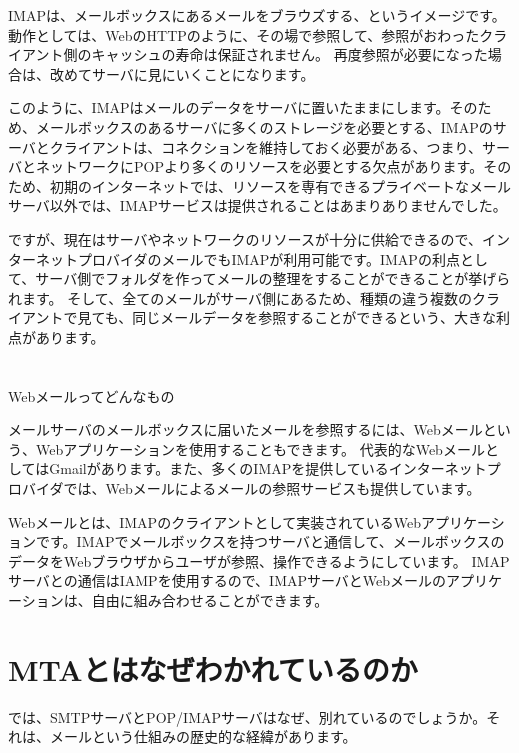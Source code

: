 IMAPは、メールボックスにあるメールをブラウズする、というイメージです。動作としては、WebのHTTPのように、その場で参照して、参照がおわったクライアント側のキャッシュの寿命は保証されません。
再度参照が必要になった場合は、改めてサーバに見にいくことになります。

このように、IMAPはメールのデータをサーバに置いたままにします。そのため、メールボックスのあるサーバに多くのストレージを必要とする、IMAPのサーバとクライアントは、コネクションを維持しておく必要がある、つまり、サーバとネットワークにPOPより多くのリソースを必要とする欠点があります。そのため、初期のインターネットでは、リソースを専有できるプライベートなメールサーバ以外では、IMAPサービスは提供されることはあまりありませんでした。

ですが、現在はサーバやネットワークのリソースが十分に供給できるので、インターネットプロバイダのメールでもIMAPが利用可能です。IMAPの利点として、サーバ側でフォルダを作ってメールの整理をすることができることが挙げられます。
そして、全てのメールがサーバ側にあるため、種類の違う複数のクライアントで見ても、同じメールデータを参照することができるという、大きな利点があります。

\section*{}
\begin{itembox}[l]{Webメールってどんなもの}

メールサーバのメールボックスに届いたメールを参照するには、Webメールという、Webアプリケーションを使用することもできます。
代表的なWebメールとしてはGmailがあります。また、多くのIMAPを提供しているインターネットプロバイダでは、Webメールによるメールの参照サービスも提供しています。

Webメールとは、IMAPのクライアントとして実装されているWebアプリケーションです。IMAPでメールボックスを持つサーバと通信して、メールボックスのデータをWebブラウザからユーザが参照、操作できるようにしています。
IMAPサーバとの通信はIAMPを使用するので、IMAPサーバとWebメールのアプリケーションは、自由に組み合わせることができます。

\end{itembox}

\section{MTAとはなぜわかれているのか}

では、SMTPサーバとPOP/IMAPサーバはなぜ、別れているのでしょうか。それは、メールという仕組みの歴史的な経緯があります。

